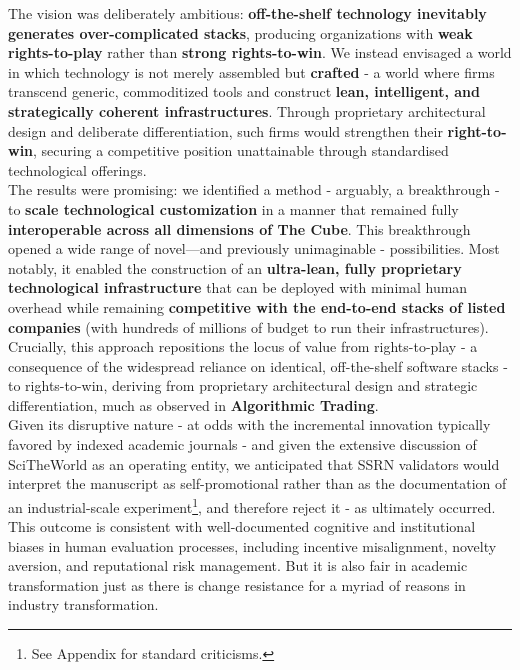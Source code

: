 \documentclass{article}
\begin{document}
The vision was deliberately ambitious: \textbf{off-the-shelf technology inevitably generates over-complicated stacks}, producing organizations with \textbf{weak rights-to-play} rather than \textbf{strong rights-to-win}. We instead envisaged a world in which technology is not merely assembled but \textbf{crafted} - a world where firms transcend generic, commoditized tools and construct \textbf{lean, intelligent, and strategically coherent infrastructures}. Through proprietary architectural design and deliberate differentiation, such firms would strengthen their \textbf{right-to-win}, securing a competitive position unattainable through standardised technological offerings.\\

The results were promising: we identified a method - arguably, a breakthrough - to \textbf{scale technological customization} in a manner that remained fully \textbf{interoperable across all dimensions of The Cube}. This breakthrough opened a wide range of novel—and previously unimaginable - possibilities. Most notably, it enabled the construction of an \textbf{ultra-lean, fully proprietary technological infrastructure} that can be deployed with minimal human overhead while remaining \textbf{competitive with the end-to-end stacks of listed companies} (with hundreds of millions of budget to run their infrastructures). Crucially, this approach repositions the locus of value from rights-to-play - a consequence of the widespread reliance on identical, off-the-shelf software stacks - to rights-to-win, deriving from proprietary architectural design and strategic differentiation, much as observed in \textbf{Algorithmic Trading}.\\

Given its disruptive nature - at odds with the incremental innovation typically favored by indexed academic journals - and given the extensive discussion of SciTheWorld as an operating entity, we anticipated that SSRN validators would interpret the manuscript as self-promotional rather than as the documentation of an industrial-scale experiment\footnote{See Appendix for standard criticisms.}, and therefore reject it - as ultimately occurred. This outcome is consistent with well-documented cognitive and institutional biases in human evaluation processes, including incentive misalignment, novelty aversion, and reputational risk management. But it is also fair in academic transformation just as there is change resistance for a myriad of reasons in industry transformation.\\
\end{document}
